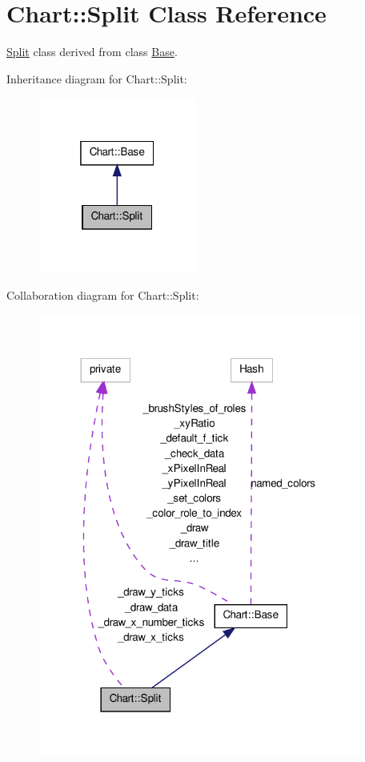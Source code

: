 \hypertarget{classChart_1_1Split}{
\section{Chart::Split Class Reference}
\label{classChart_1_1Split}
}


\hyperlink{classChart_1_1Split}{Split} class derived from class \hyperlink{classChart_1_1Base}{Base}.  




Inheritance diagram for Chart::Split:\nopagebreak
\begin{figure}[H]
\begin{center}
\leavevmode
\includegraphics[width=148pt]{classChart_1_1Split__inherit__graph}
\end{center}
\end{figure}


Collaboration diagram for Chart::Split:\nopagebreak
\begin{figure}[H]
\begin{center}
\leavevmode
\includegraphics[width=300pt]{classChart_1_1Split__coll__graph}
\end{center}
\end{figure}
